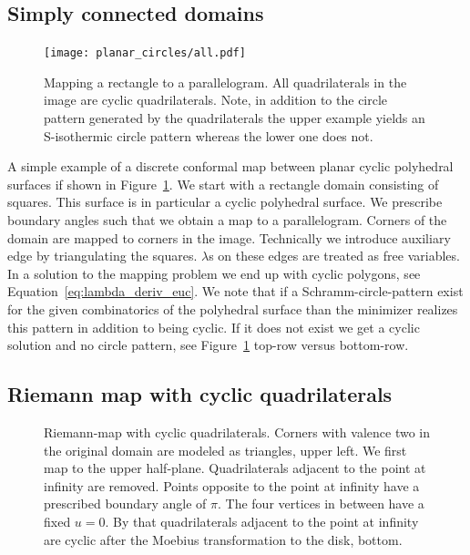 \documentclass[Thesis.tex]{subfiles}
\begin{document}
\subsection{Simply connected domains}

\begin{figure}
\centering
\texttt{[image: planar\_circles/all.pdf]}
\\
\caption{
Mapping a rectangle to a parallelogram.
All quadrilaterals in the image are cyclic quadrilaterals.
Note, in addition to the circle pattern generated by the quadrilaterals the upper example yields an S-isothermic circle pattern whereas the lower one does not.
}
\label{fig:cyclic_parallelogram}
\end{figure}

A simple example of a discrete conformal map between planar cyclic polyhedral surfaces if shown in 
Figure~\ref{fig:cyclic_parallelogram}. We start with a rectangle domain consisting of squares. This surface 
is in particular a cyclic polyhedral surface. We prescribe boundary angles such that we obtain a map to a 
parallelogram. Corners of the domain are mapped to corners in the image.
Technically we introduce auxiliary edge by triangulating the squares. $\lambda$s on these edges are treated
as free variables. In a solution to the mapping problem we end up with cyclic polygons, see Equation~\ref{eq:lambda_deriv_euc}.
We note that if a Schramm-circle-pattern \cite{S97} exist for the given combinatorics of the polyhedral surface than
the minimizer realizes this pattern in addition to being cyclic. 
If it does not exist we get a cyclic solution and no circle pattern, see Figure~\ref{fig:cyclic_parallelogram}
top-row versus bottom-row.


\subsection{Riemann map with cyclic quadrilaterals}

\begin{figure}
\centering
{}
\caption{
Riemann-map with cyclic quadrilaterals.
Corners with valence two in the original domain are modeled as triangles, upper left.
We first map to the upper half-plane.
Quadrilaterals adjacent to the point at infinity are removed.
Points opposite to the point at infinity have a prescribed boundary angle of $\pi$.
The four vertices in between have a fixed $u=0$.
By that quadrilaterals adjacent to the point at infinity are cyclic after the Moebius transformation to the disk, bottom.
}
\label{fig:circular_riemann}
\end{figure}
\end{document}
